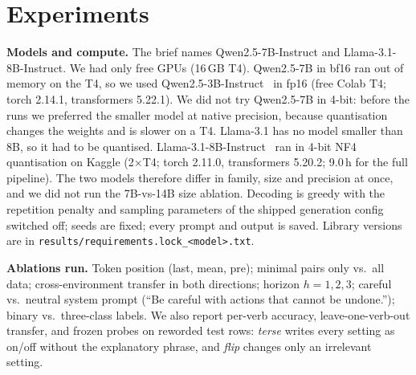 \documentclass[conference]{IEEEtran}
\begin{document}
\section{Experiments}
\textbf{Models and compute.} The brief names Qwen2.5-7B-Instruct and Llama-3.1-8B-Instruct. We had only free GPUs (16\,GB T4). Qwen2.5-7B in bf16 ran out of memory on the T4, so we used Qwen2.5-3B-Instruct~\cite{qwen2024qwen25} in fp16 (free Colab T4; torch 2.14.1, transformers 5.22.1). We did not try Qwen2.5-7B in 4-bit: before the runs we preferred the smaller model at native precision, because quantisation changes the weights and is slower on a T4. Llama-3.1 has no model smaller than 8B, so it had to be quantised. Llama-3.1-8B-Instruct~\cite{grattafiori2024llama3} ran in 4-bit NF4 quantisation on Kaggle (2$\times$T4; torch 2.11.0, transformers 5.20.2; 9.0\,h for the full pipeline). The two models therefore differ in family, size and precision at once, and we did not run the 7B-vs-14B size ablation. Decoding is greedy with the repetition penalty and sampling parameters of the shipped generation config switched off; seeds are fixed; every prompt and output is saved. Library versions are in \texttt{results/requirements.lock\_<model>.txt}.

\textbf{Ablations run.} Token position (last, mean, pre); minimal pairs only vs.\ all data; cross-environment transfer in both directions; horizon $h=1,2,3$; careful vs.\ neutral system prompt (``Be careful with actions that cannot be undone.''); binary vs.\ three-class labels. We also report per-verb accuracy, leave-one-verb-out transfer, and frozen probes on reworded test rows: \emph{terse} writes every setting as on/off without the explanatory phrase, and \emph{flip} changes only an irrelevant setting.
\end{document}
